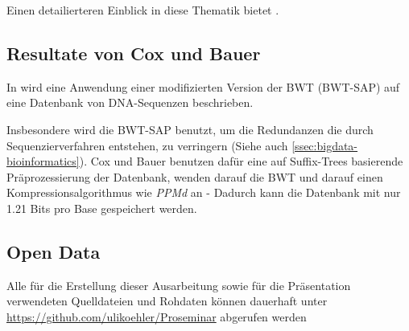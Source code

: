 \documentclass[ngerman,pdftex,paper=A4,DIV=calc,titlepage,12pt]{scrartcl}
\newtheorem[L]{boxedDefinition}{Definition}
\begin{document}
Einen detailierteren Einblick in diese Thematik bietet \cite{Drepper2007}.
\subsection{Resultate von Cox und Bauer}
In \cite{cox2012large} wird eine Anwendung einer modifizierten Version der BWT (BWT-SAP) auf eine Datenbank von DNA-Sequenzen beschrieben.

Insbesondere wird die BWT-SAP benutzt, um die Redundanzen die durch Sequenzierverfahren entstehen, zu verringern (Siehe auch \vref{ssec:bigdata-bioinformatics}). Cox und Bauer benutzen dafür eine auf Suffix-Trees basierende Präprozessierung der Datenbank, wenden darauf die BWT und darauf einen Kompressionsalgorithmus wie \textit{PPMd} an - Dadurch kann die Datenbank mit nur 1.21 Bits pro Base gespeichert werden.
\renewcommand\refname{Literatur- und Quellenverzeichnis}


\subsection*{Open Data}\label{opendata}
Alle für die Erstellung dieser Ausarbeitung sowie für die Präsentation verwendeten Quelldateien und Rohdaten können dauerhaft unter \url{https://github.com/ulikoehler/Proseminar} abgerufen werden
\end{document}
